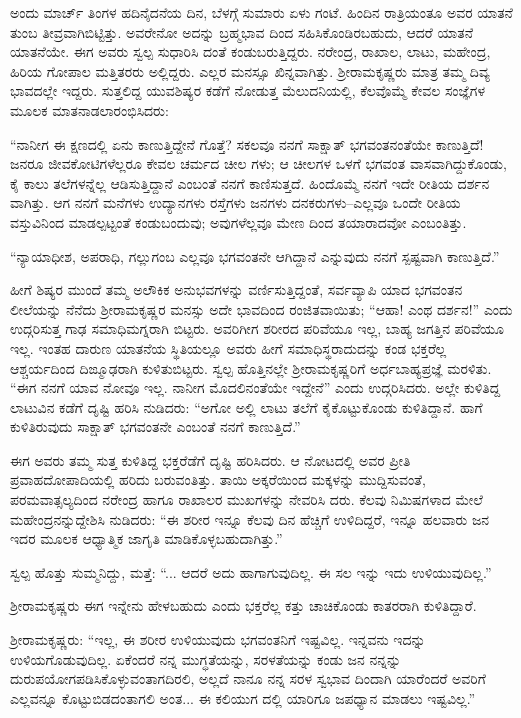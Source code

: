 ಅಂದು ಮಾರ್ಚ್ ತಿಂಗಳ ಹದಿನೈದನೆಯ ದಿನ, ಬೆಳಗ್ಗೆ ಸುಮಾರು ಏಳು ಗಂಟೆ. ಹಿಂದಿನ ರಾತ್ರಿಯಂತೂ ಅವರ ಯಾತನೆ ತುಂಬ ತೀವ್ರವಾಗಿಬಿಟ್ಟಿತ್ತು. ಅವರೇನೋ ಅದನ್ನು ಬ್ರಹ್ಮಭಾವ ದಿಂದ ಸಹಿಸಿಕೊಂಡಿರಬಹುದು, ಆದರೆ ಯಾತನೆ ಯಾತನೆಯೇ. ಈಗ ಅವರು ಸ್ವಲ್ಪ ಸುಧಾರಿಸಿ ದಂತೆ ಕಂಡುಬರುತ್ತಿದ್ದರು. ನರೇಂದ್ರ, ರಾಖಾಲ, ಲಾಟು, ಮಹೇಂದ್ರ, ಹಿರಿಯ ಗೋಪಾಲ ಮತ್ತಿತರರು ಅಲ್ಲಿದ್ದರು. ಎಲ್ಲರ ಮನಸ್ಸೂ ಖಿನ್ನವಾಗಿತ್ತು. ಶ್ರೀರಾಮಕೃಷ್ಣರು ಮಾತ್ರ ತಮ್ಮ ದಿವ್ಯ ಭಾವದಲ್ಲೇ ಇದ್ದರು. ಸುತ್ತಲಿದ್ದ ಯುವಶಿಷ್ಯರ ಕಡೆಗೆ ನೋಡುತ್ತ ಮೆಲುದನಿಯಲ್ಲಿ, ಕೆಲವೊಮ್ಮೆ ಕೇವಲ ಸಂಜ್ಞೆಗಳ ಮೂಲಕ ಮಾತನಾಡಲಾರಂಭಿಸಿದರು:

“ನಾನೀಗ ಈ ಕ್ಷಣದಲ್ಲಿ ಏನು ಕಾಣುತ್ತಿದ್ದೇನೆ ಗೊತ್ತೆ? ಸಕಲವೂ ನನಗೆ ಸಾಕ್ಷಾತ್ ಭಗವಂತನಂತೆಯೇ ಕಾಣುತ್ತಿದೆ! ಜನರೂ ಜೀವಕೋಟಿಗಳೆಲ್ಲರೂ ಕೇವಲ ಚರ್ಮದ ಚೀಲ ಗಳು; ಆ ಚೀಲಗಳ ಒಳಗೆ ಭಗವಂತ ವಾಸವಾಗಿದ್ದುಕೊಂಡು, ಕೈ ಕಾಲು ತಲೆಗಳನ್ನೆಲ್ಲ ಆಡಿಸುತ್ತಿದ್ದಾನೆ ಎಂಬಂತೆ ನನಗೆ ಕಾಣಿಸುತ್ತದೆ. ಹಿಂದೊಮ್ಮೆ ನನಗೆ ಇದೇ ರೀತಿಯ ದರ್ಶನ ವಾಗಿತ್ತು. ಆಗ ನನಗೆ ಮನೆಗಳು ಉದ್ಯಾನಗಳು ರಸ್ತೆಗಳು ಜನಗಳು ದನಕರುಗಳು–ಎಲ್ಲವೂ ಒಂದೇ ರೀತಿಯ ವಸ್ತುವಿನಿಂದ ಮಾಡಲ್ಪಟ್ಟಂತೆ ಕಂಡುಬಂದುವು; ಅವುಗಳೆಲ್ಲವೂ ಮೇಣ ದಿಂದ ತಯಾರಾದವೋ ಎಂಬಂತಿತ್ತು.

“ನ್ಯಾಯಾಧೀಶ, ಅಪರಾಧಿ, ಗಲ್ಲುಗಂಬ ಎಲ್ಲವೂ ಭಗವಂತನೇ ಆಗಿದ್ದಾನೆ ಎನ್ನುವುದು ನನಗೆ ಸ್ಪಷ್ಟವಾಗಿ ಕಾಣುತ್ತಿದೆ.”

ಹೀಗೆ ಶಿಷ್ಯರ ಮುಂದೆ ತಮ್ಮ ಅಲೌಕಿಕ ಅನುಭವಗಳನ್ನು ವರ್ಣಿಸುತ್ತಿದ್ದಂತೆ, ಸರ್ವವ್ಯಾಪಿ ಯಾದ ಭಗವಂತನ ಲೀಲೆಯನ್ನು ನೆನೆದು ಶ್ರೀರಾಮಕೃಷ್ಣರ ಮನಸ್ಸು ಅದೇ ಭಾವದಿಂದ ರಂಜಿತವಾಯಿತು; “ಆಹಾ! ಎಂಥ ದರ್ಶನ!” ಎಂದು ಉದ್ಗರಿಸುತ್ತ ಗಾಢ ಸಮಾಧಿಮಗ್ನರಾಗಿ ಬಿಟ್ಟರು. ಅವರಿಗೀಗ ಶರೀರದ ಪರಿವೆಯೂ ಇಲ್ಲ, ಬಾಹ್ಯ ಜಗತ್ತಿನ ಪರಿವೆಯೂ ಇಲ್ಲ. ಇಂತಹ ದಾರುಣ ಯಾತನೆಯ ಸ್ಥಿತಿಯಲ್ಲೂ ಅವರು ಹೀಗೆ ಸಮಾಧಿಸ್ಥರಾದುದನ್ನು ಕಂಡ ಭಕ್ತರೆಲ್ಲ ಆಶ್ಚರ್ಯದಿಂದ ದಿಙ್ಮೂಢರಾಗಿ ಕುಳಿತುಬಿಟ್ಟರು. ಸ್ವಲ್ಪ ಹೊತ್ತಿನಲ್ಲೇ ಶ್ರೀರಾಮಕೃಷ್ಣರಿಗೆ ಅರ್ಧಬಾಹ್ಯಪ್ರಜ್ಞೆ ಮರಳಿತು. “ಈಗ ನನಗೆ ಯಾವ ನೋವೂ ಇಲ್ಲ. ನಾನೀಗ ಮೊದಲಿನಂತೆಯೇ ಇದ್ದೇನೆ” ಎಂದು ಉದ್ಗರಿಸಿದರು. ಅಲ್ಲೇ ಕುಳಿತಿದ್ದ ಲಾಟುವಿನ ಕಡೆಗೆ ದೃಷ್ಟಿ ಹರಿಸಿ ನುಡಿದರು: “ಅಗೋ ಅಲ್ಲಿ ಲಾಟು ತಲೆಗೆ ಕೈಕೊಟ್ಟುಕೊಂಡು ಕುಳಿತಿದ್ದಾನೆ. ಹಾಗೆ ಕುಳಿತಿರುವುದು ಸಾಕ್ಷಾತ್ ಭಗವಂತನೇ ಎಂಬಂತೆ ನನಗೆ ಕಾಣುತ್ತಿದೆ.”

ಈಗ ಅವರು ತಮ್ಮ ಸುತ್ತ ಕುಳಿತಿದ್ದ ಭಕ್ತರೆಡೆಗೆ ದೃಷ್ಟಿ ಹರಿಸಿದರು. ಆ ನೋಟದಲ್ಲಿ ಅವರ ಪ್ರೀತಿ ಪ್ರವಾಹದೋಪಾದಿಯಲ್ಲಿ ಹರಿದು ಬರುವಂತಿತ್ತು. ತಾಯಿ ಅಕ್ಕರೆಯಿಂದ ಮಕ್ಕಳನ್ನು ಮುದ್ದಿಸುವಂತೆ, ಪರಮವಾತ್ಸಲ್ಯದಿಂದ ನರೇಂದ್ರ ಹಾಗೂ ರಾಖಾಲರ ಮುಖಗಳನ್ನು ನೇವರಿಸಿ ದರು. ಕೆಲವು ನಿಮಿಷಗಳಾದ ಮೇಲೆ ಮಹೇಂದ್ರನನ್ನುದ್ದೇಶಿಸಿ ನುಡಿದರು: “ಈ ಶರೀರ ಇನ್ನೂ ಕೆಲವು ದಿನ ಹೆಚ್ಚಿಗೆ ಉಳಿದಿದ್ದರೆ, ಇನ್ನೂ ಹಲವಾರು ಜನ ಇದರ ಮೂಲಕ ಆಧ್ಯಾತ್ಮಿಕ ಜಾಗೃತಿ ಮಾಡಿಕೊಳ್ಳಬಹುದಾಗಿತ್ತು.”

ಸ್ವಲ್ಪ ಹೊತ್ತು ಸುಮ್ಮನಿದ್ದು, ಮತ್ತೆ: “... ಆದರೆ ಅದು ಹಾಗಾಗುವುದಿಲ್ಲ. ಈ ಸಲ ಇನ್ನು ಇದು ಉಳಿಯುವುದಿಲ್ಲ.”

ಶ್ರೀರಾಮಕೃಷ್ಣರು ಈಗ ಇನ್ನೇನು ಹೇಳಬಹುದು ಎಂದು ಭಕ್ತರೆಲ್ಲ ಕತ್ತು ಚಾಚಿಕೊಂಡು ಕಾತರರಾಗಿ ಕುಳಿತಿದ್ದಾರೆ. 

ಶ್ರೀರಾಮಕೃಷ್ಣರು: “ಇಲ್ಲ, ಈ ಶರೀರ ಉಳಿಯುವುದು ಭಗವಂತನಿಗೆ ಇಷ್ಟವಿಲ್ಲ. ಇನ್ನವನು ಇದನ್ನು ಉಳಿಯಗೊಡುವುದಿಲ್ಲ. ಏಕೆಂದರೆ ನನ್ನ ಮುಗ್ಧತೆಯನ್ನು, ಸರಳತೆಯನ್ನು ಕಂಡು ಜನ ನನ್ನನ್ನು ದುರುಪಯೋಗಪಡಿಸಿಕೊಳ್ಳುವಂತಾಗದಿರಲಿ, ಅಲ್ಲದೆ ನಾನೂ ನನ್ನ ಸರಳ ಸ್ವಭಾವ ದಿಂದಾಗಿ ಯಾರೆಂದರೆ ಅವರಿಗೆ ಎಲ್ಲವನ್ನೂ ಕೊಟ್ಟುಬಿಡದಂತಾಗಲಿ ಅಂತ... ಈ ಕಲಿಯುಗ ದಲ್ಲಿ ಯಾರಿಗೂ ಜಪಧ್ಯಾನ ಮಾಡಲು ಇಷ್ಟವಿಲ್ಲ.”

